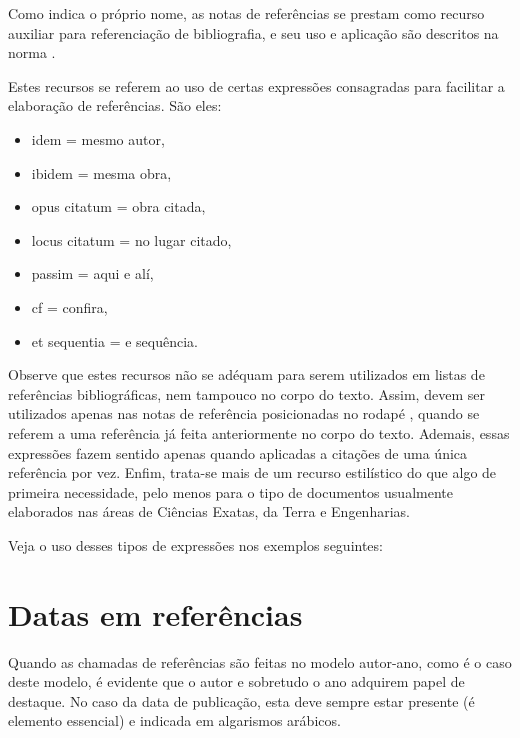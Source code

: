 \begin{apendicesenv}
    Como indica o próprio nome, as notas de referências se prestam como recurso auxiliar para referenciação de bibliografia, e seu uso e aplicação são descritos na norma .

    Estes recursos se referem ao uso de certas expressões consagradas para facilitar a elaboração de referências.
    São eles:

    \begin{itemize}
        \item idem = mesmo autor,
        \item ibidem = mesma obra,
        \item opus citatum = obra citada,
        \item locus citatum = no lugar citado,
        \item passim = aqui e alí,
        \item cf = confira,
        \item et sequentia = e sequência.
    \end{itemize}

    Observe que estes recursos não se adéquam para serem utilizados em listas de referências bibliográficas, nem tampouco no corpo do texto.
    Assim, devem ser utilizados apenas nas notas de referência posicionadas no rodapé \cite[p.~6]{abnTeX22014c}, quando se referem a uma referência já feita anteriormente no corpo do texto.
    Ademais, essas expressões fazem sentido apenas quando aplicadas a citações de uma única referência por vez.
    Enfim, trata-se mais de um recurso estilístico do que algo de primeira necessidade, pelo menos para o tipo de documentos usualmente elaborados nas áreas de Ciências Exatas, da Terra e Engenharias.

    Veja o uso desses tipos de expressões nos exemplos seguintes:






    \section{Datas em referências}
    \label{sec_datas_em_referencias}

    Quando as chamadas de referências são feitas no modelo autor-ano, como é o caso deste modelo, é evidente que o autor e sobretudo o ano adquirem papel de destaque.
    No caso da data de publicação, esta deve sempre estar presente (é elemento essencial) e indicada em algarismos arábicos.


\end{apendicesenv}
